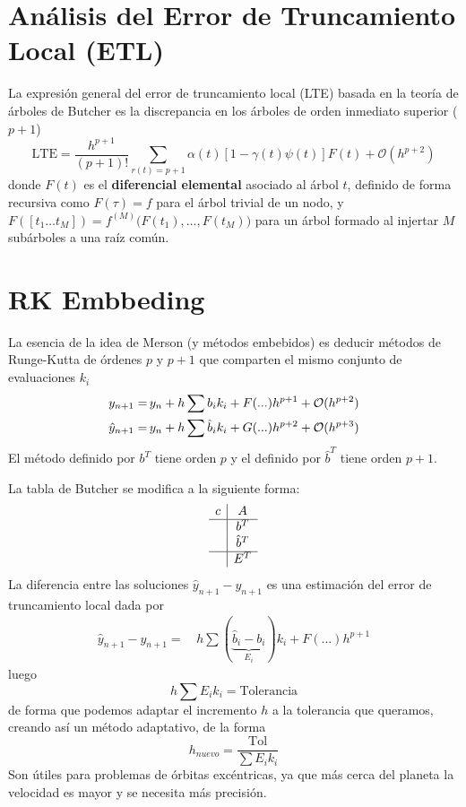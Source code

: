 \section{Análisis del Error de Truncamiento Local (ETL)}
La expresión general del error de truncamiento local (LTE) basada en la teoría de árboles de Butcher es la discrepancia en los árboles de orden inmediato superior ($p+1$)
$$ \text{LTE} = \frac{h^{p+1}}{(p+1)!} \sum_{r(t)=p+1} \alpha(t) \left[1 - \gamma(t)\psi(t)\right] F(t) + \mathcal{O}(h^{p+2}) $$
donde $F(t)$ es el \textbf{diferencial elemental} asociado al árbol $t$, definido de forma recursiva como $F(\tau) = f$ para el árbol trivial de un nodo, y $F([t_1 \dots t_M]) = f^{(M)}\big(F(t_1), \dots, F(t_M)\big)$ para un árbol formado al injertar $M$ subárboles a una raíz común.


\section{RK Embbeding} 
La esencia de la idea de Merson (y métodos embebidos) es deducir métodos de Runge-Kutta de órdenes $p$ y $p+1$ que comparten el mismo conjunto de evaluaciones $k_i$
\begin{align*}
    y_{n+1} = & \, y_n+ h \sum b_i k_i + F(...) h^{p+1} + \mathcal{O}(h^{p+2}) \\
    \hat y _{n+1} = & \, y_n+ h \sum \hat b _i k_i + G(...) h^{p+2} + \mathcal{O}(h^{p+3})  
 \end{align*}
 El método definido por $b^T$ tiene orden $p$ y el definido por $\hat{b}^T$ tiene orden $p+1$.
 
 La tabla de Butcher se modifica a la siguiente forma:
\begin{equation*}
\begin{array}{c|c}
c & A \\
\hline
& b^T \\
& \hat{b}^T \\
\hline
& E^T
\end{array}
\end{equation*}
 La diferencia entre las soluciones $\hat{y}_{n+1} - y_{n+1}$ es una estimación del error de truncamiento local dada por 
 \begin{align*}
    \hat y _{n+1}  - y_{n+1} = & \, h \sum (\underbrace{\hat b_i-b_i}_{E_i}) k_i + F(...) h^{p+1} 
 \end{align*}
 luego
 $$h \sum E_i k_i = \text{Tolerancia}$$
 de forma que podemos adaptar el incremento $h$ a la tolerancia que queramos, creando as\'i un m\'etodo adaptativo, de la forma
$$h_{nuevo} = \frac{\text{Tol}}{\sum E_i k_i}$$
Son \'utiles para problemas de \'orbitas exc\'entricas, ya que m\'as cerca del planeta la velocidad es mayor y se necesita m\'as precisi\'on.


